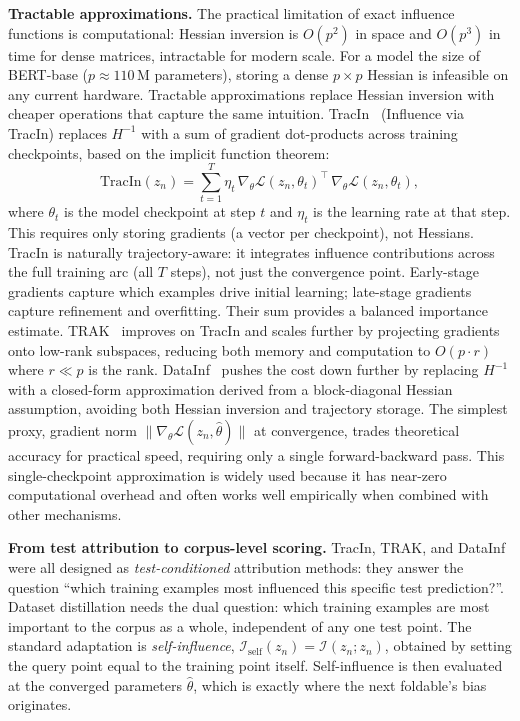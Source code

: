 \begin{foldable}
  \textbf{Tractable approximations.}
  The practical limitation of exact influence functions is computational: Hessian inversion is $O(p^2)$ in space and $O(p^3)$ in time for dense matrices, intractable for modern scale.
  For a model the size of BERT-base ($p \approx 110$\,M parameters), storing a dense $p \times p$ Hessian is infeasible on any current hardware.
  Tractable approximations replace Hessian inversion with cheaper operations that capture the same intuition.
  TracIn~\cite{pruthi2020estimating} (Influence via TracIn) replaces $H^{-1}$ with a sum of gradient dot-products across training checkpoints, based on the implicit function theorem:
  \begin{equation}
    \text{TracIn}(z_n) = \sum_{t=1}^{T} \eta_t \,
    \nabla_\theta \mathcal{L}(z_n, \theta_t)^\top \,
    \nabla_\theta \mathcal{L}(z_n, \theta_t),
    \label{eq:tracin}
  \end{equation}
  where $\theta_t$ is the model checkpoint at step $t$ and $\eta_t$ is the learning rate at that step.
  This requires only storing gradients (a vector per checkpoint), not Hessians.
  TracIn is naturally trajectory-aware: it integrates influence contributions across the full training arc (all $T$ steps), not just the convergence point.
  Early-stage gradients capture which examples drive initial learning; late-stage gradients capture refinement and overfitting.
  Their sum provides a balanced importance estimate.
  TRAK~\cite{park2023trak} improves on TracIn and scales further by projecting gradients onto low-rank subspaces, reducing both memory and computation to $O(p \cdot r)$ where $r \ll p$ is the rank.
  DataInf~\cite{kwon2023datainf} pushes the cost down further by replacing $H^{-1}$ with a closed-form approximation derived from a block-diagonal Hessian assumption, avoiding both Hessian inversion and trajectory storage.
  The simplest proxy, gradient norm $\|\nabla_\theta \mathcal{L}(z_n, \hat\theta)\|$ at convergence, trades theoretical accuracy for practical speed, requiring only a single forward-backward pass.
  This single-checkpoint approximation is widely used because it has near-zero computational overhead and often works well empirically when combined with other mechanisms.
\end{foldable}

\begin{foldable}
  \textbf{From test attribution to corpus-level scoring.}
  TracIn, TRAK, and DataInf were all designed as \textit{test-conditioned} attribution methods: they answer the question ``which training examples most influenced this specific test prediction?''.
  Dataset distillation needs the dual question: which training examples are most important to the corpus as a whole, independent of any one test point.
  The standard adaptation is \textit{self-influence}, $\mathcal{I}_\text{self}(z_n) = \mathcal{I}(z_n; z_n)$, obtained by setting the query point equal to the training point itself.
  Self-influence is then evaluated at the converged parameters $\hat\theta$, which is exactly where the next foldable's bias originates.
\end{foldable}

